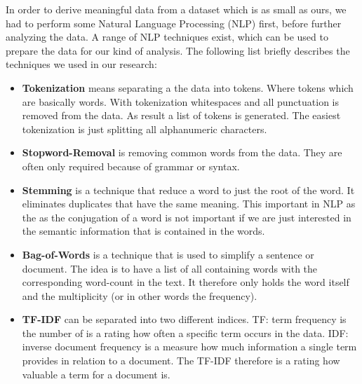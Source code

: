 In order to derive meaningful data from a dataset which is as small as ours, we had to perform some Natural Language Processing (NLP) first, before further analyzing the data. A range of NLP techniques exist, which can be used to prepare the data for our kind of analysis\cite{solangi_review_2018}\cite{ferrari_natural_2018}. The following list briefly describes the techniques we used in our research:

\begin{itemize}
	\item \textbf{Tokenization} means separating a the data into tokens. Where tokens which are basically words. With tokenization whitespaces and all punctuation is removed from the data. As result a list of tokens is generated. The easiest tokenization is just splitting all alphanumeric characters.
	\item \textbf{Stopword-Removal} is removing common words from the data. They are often only required because of grammar or syntax.
	\item \textbf{Stemming} is a technique that reduce a word to just the root of the word. It eliminates duplicates that have the same meaning. This important in NLP as the as the conjugation of a word is not important if we are just interested in the semantic information that is contained in the words.
	\item \textbf{Bag-of-Words} is a technique that is used to simplify a sentence or document. The idea is to have a list of all containing words with the corresponding word-count in the text. It therefore only holds the word itself and the multiplicity (or in other words the frequency).
	\item \textbf{TF-IDF} can be separated into two different indices. TF: term frequency is the number of is a rating how often a specific term occurs in the data. IDF: inverse document frequency is a measure how much information a single term provides in relation to a document. The TF-IDF therefore is a rating how valuable a term for a document is.
\end{itemize}